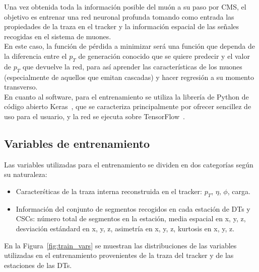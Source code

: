 
Una vez obtenida toda la informaci\'on posible del mu\'on a su paso por CMS, el objetivo es entrenar una red neuronal profunda tomando como entrada las propiedades de la traza en el tracker y la informaci\'on espacial de las se\~nales recogidas en el sistema de muones. \\
En este caso, la funci\'on de p\'erdida a minimizar ser\'a una funci\'on que dependa de la diferencia entre el $p_{T}$ de generaci\'on conocido que se quiere predecir y el valor de $p_{T}$ que devuelve la red, para as\'i aprender las caracter\'isticas de los muones (especialmente de aquellos que emitan cascadas) y hacer regresi\'on a su momento transverso. \\

En cuanto al software, para el entrenamiento se utiliza la librer\'ia de Python de c\'odigo abierto Keras~\cite{chollet2015keras}, que se caracteriza principalmente por ofrecer sencillez de uso para el usuario, y la red se ejecuta sobre TensorFlow~\cite{tensorflow2015-whitepaper}.


\subsection{Variables de entrenamiento}\label{sec:variables}

Las variables utilizadas para el entrenamiento se dividen en dos categor\'ias seg\'un su naturaleza:

\begin{itemize}
\item Caracter\'sticas de la traza interna reconstruida en el tracker: $p_{T}$, $\eta$, $\phi$, carga.
\item Informaci\'on del conjunto de segmentos recogidos en cada estaci\'on de DTs y CSCs: n\'umero total de segmentos en la estaci\'on, media espacial en x, y, z, desviaci\'on est\'andard en x, y, z, asimetr\'ia en x, y, z, kurtosis en x, y, z.
\end{itemize}

En la Figura~\ref{fig:train_vars} se muestran las distribuciones de las variables utilizadas en el entrenamiento provenientes de la traza del tracker y de las estaciones de las DTs.

